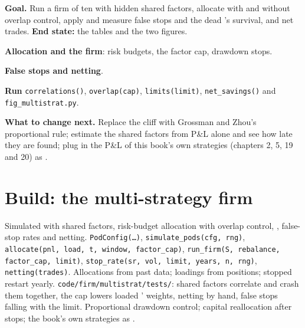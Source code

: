 \begin{tutorial}
\textbf{Goal.} Run a firm of ten  with hidden shared factors, allocate with and without overlap control, apply  and measure false
stops and the dead 's survival, and net trades. \textbf{End state:} the tables and the two figures.
\begin{tutsteps}
\item \textbf{Allocation and the firm}: risk budgets, the factor cap, drawdown stops.
\label{lst:s1:running-a-multi-strategy-book:firm}
\item \textbf{False stops and netting}.
\label{lst:s1:running-a-multi-strategy-book:stops}
\item \textbf{Run} \texttt{correlations()}, \texttt{overlap(cap)}, \texttt{limits(limit)}, \texttt{net\_savings()} and \texttt{fig\_multistrat.py}.
\end{tutsteps}
\textbf{What to change next.} Replace the cliff with Grossman and Zhou's proportional rule; estimate the shared factors from P\&L alone and see how
late they are found; plug in the P\&L of this book's own strategies (chapters 2, 5, 19 and 20) as .
\end{tutorial}

\section{Build: the multi-strategy firm}\label{bld:s1:running-a-multi-strategy-book:multistrat}

\begin{build}
 Simulated  with shared factors, risk-budget allocation with overlap control, , false-stop rates and netting.
 \texttt{PodConfig(\dots)}, \texttt{simulate\_pods(cfg, rng)}, \texttt{allocate(pnl, load, t, window, factor\_cap)}, \texttt{run\_firm(S,
rebalance, factor\_cap, limit)}, \texttt{stop\_rate(sr, vol, limit, years, n, rng)}, \texttt{netting(trades)}.
 Allocations from past data; loadings from positions; stopped  restart yearly.
 \texttt{code/firm/multistrat/tests/}: shared factors correlate  and crash them together, the cap lowers loaded '
weights, netting by hand, false stops falling with the limit.
 Proportional drawdown control; capital reallocation after stops; the book's own strategies as .
\end{build}

